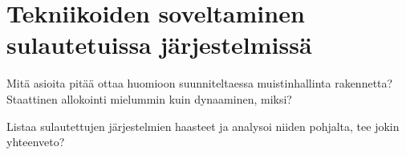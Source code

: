 \chapter{Tekniikoiden soveltaminen sulautetuissa järjestelmissä} \label{Kuudes luku}

Mitä asioita pitää ottaa huomioon suunniteltaessa muistinhallinta rakennetta?
Staattinen allokointi mielummin kuin dynaaminen, miksi?

Listaa sulautettujen järjestelmien haasteet ja analysoi niiden pohjalta, tee jokin yhteenveto?